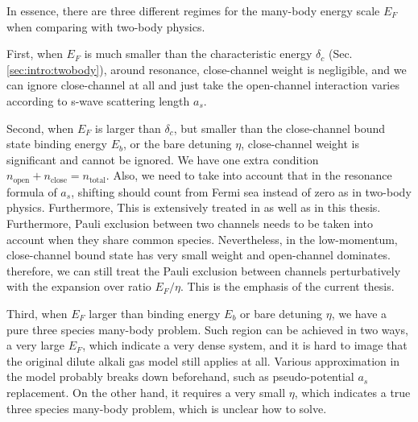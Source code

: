 In essence, there are three different regimes for the many-body energy scale $E_F$ when comparing with two-body physics.  

First, when $E_F$ is much smaller than the characteristic energy $\delta_c$ (Sec. \ref{sec:intro:twobody}), around resonance, close-channel weight is negligible, and we can ignore close-channel at all and just take the open-channel interaction varies according to s-wave scattering length $a_s$. 

Second, when $E_F$ is larger than $\delta_c$, but smaller than the close-channel bound state binding energy $E_b$, or the bare detuning $\eta$, close-channel weight is significant and cannot be ignored.  We have one extra condition $n_{\text{open}}+n_{\text{close}}=n_{\text{total}}$. Also, we need to take into account that in the resonance formula of $a_s$, shifting should count from Fermi sea instead of zero as in two-body physics.  Furthermore,  This is extensively treated in \cite{GurarieNarrow} as well as in this thesis.  Furthermore, Pauli exclusion between two channels needs to be taken into account when they share common species.  Nevertheless, in the low-momentum, close-channel bound state has very small weight and  open-channel dominates.  therefore, we can still treat the Pauli exclusion between channels perturbatively with the expansion over ratio $E_F/\eta$.  This is the emphasis of the current thesis.  

Third, when $E_F$ larger than binding energy $E_b$ or bare detuning $\eta$, we have a pure three species many-body problem. Such region can be achieved in two ways, a very large $E_F$, which indicate a very dense system, and it is hard to image that  the original dilute alkali gas model still applies at all. Various approximation in the model probably breaks down beforehand, such as pseudo-potential $a_s$ replacement. On the other hand, it requires a very small $\eta$, which indicates a true three species many-body problem, which is unclear how to solve.   